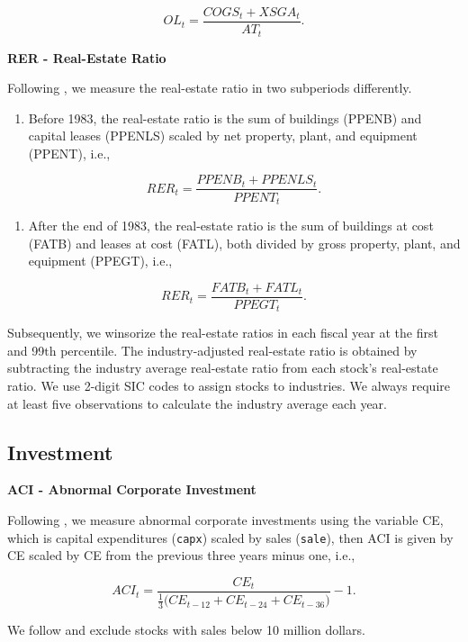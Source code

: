 \documentclass[
  article]{jss}
\providecommand{\tightlist}{%
  \setlength{\itemsep}{0pt}\setlength{\parskip}{0pt}}
\begin{document}
\[
OL_{t} = \frac{COGS_{t} + XSGA_{t}}{AT_{t}}\text{.}
\]

\textbf{RER - Real-Estate Ratio}

Following \citet{tuzel.2010}, we measure the real-estate ratio in two
subperiods differently.

\begin{enumerate}
\def\labelenumi{(\alph{enumi})}
\tightlist
\item
  Before 1983, the real-estate ratio is the sum of buildings (PPENB) and
  capital leases (PPENLS) scaled by net property, plant, and equipment
  (PPENT), i.e.,
\end{enumerate}

\[
RER_{t} = \frac{PPENB_{t} + PPENLS_{t}}{PPENT_{t}}\text{.}
\]

\begin{enumerate}
\def\labelenumi{(\alph{enumi})}
\setcounter{enumi}{1}
\tightlist
\item
  After the end of 1983, the real-estate ratio is the sum of buildings
  at cost (FATB) and leases at cost (FATL), both divided by gross
  property, plant, and equipment (PPEGT), i.e.,
\end{enumerate}

\[
RER_{t} = \frac{FATB_{t} + FATL_{t}}{PPEGT_{t}}\text{.}
\]

Subsequently, we winsorize the real-estate ratios in each fiscal year at
the first and 99\(\text{th}\) percentile. The industry-adjusted
real-estate ratio is obtained by subtracting the industry average
real-estate ratio from each stock's real-estate ratio. We use 2-digit
SIC codes to assign stocks to industries. We always require at least
five observations to calculate the industry average each year.

\subsection{Investment}\label{investment}

\textbf{ACI - Abnormal Corporate Investment}

Following \citet{titman.2004}, we measure abnormal corporate investments
using the variable CE, which is capital expenditures (\texttt{capx})
scaled by sales (\texttt{sale}), then ACI is given by CE scaled by CE
from the previous three years minus one, i.e.,

\[
ACI_{t} = \frac{CE_{t}}{\frac{1}{3} \big(CE_{t-12} + CE_{t-24} + CE_{t-36} \big)}-1\text{.}
\]

We follow \citet{hou.2020} and exclude stocks with sales below 10
million dollars.
\end{document}
